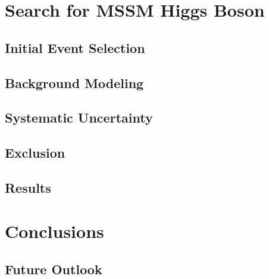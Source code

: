\documentclass[oneside, letterpaper, 12pt, oldfontcommands]{memoir}
\begin{document}
\chapter{Search for MSSM Higgs Boson}
\section{Initial Event Selection}
\section{Background Modeling}
\section{Systematic Uncertainty}
\section{Exclusion}
\section{Results}


\chapter{Conclusions}
\section{Future Outlook}
\end{document}
